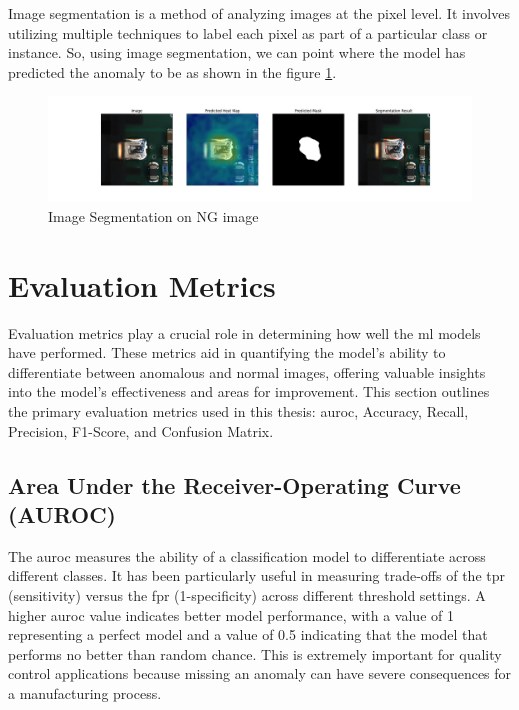 Image segmentation is a method of analyzing images at the pixel level. It involves utilizing multiple techniques to label each pixel as part of a particular class or instance\cite{IBM2024}. So, using image segmentation, we can point where the model has predicted the anomaly to be as shown in the figure \ref{fig:Image Segmentation on NG image}.

\begin{figure}[H]
    \centering
    \includegraphics[width=1\linewidth]{Images/anomalous_image_segmentation.jpg}
    \caption{Image Segmentation on NG image}
    \label{fig:Image Segmentation on NG image}
\end{figure}

\section{Evaluation Metrics}
\label{subsec:Evaluation Metrics}

Evaluation metrics play a crucial role in determining how well the \gls{ml} models have performed. These metrics aid in quantifying the model's ability to differentiate between anomalous and normal images, offering valuable insights into the model's effectiveness and areas for improvement. This section outlines the primary evaluation metrics used in this thesis: \gls{auroc}, Accuracy, Recall, Precision, F1-Score, and Confusion Matrix.

\subsection*{Area Under the Receiver-Operating Curve (AUROC)}
\label{subsec:AUROC}

The \gls{auroc} measures the ability of a classification model to differentiate across different classes. It has been particularly useful in measuring trade-offs of the \gls{tpr} (sensitivity) versus the \gls{fpr} (1-specificity) across different threshold settings. A higher \gls{auroc} value indicates better model performance, with a value of 1 representing a perfect model and a value of 0.5 indicating that the model that performs no better than random chance\cite{FAWCETT2006861}. This is extremely important for quality control applications because missing an anomaly can have severe consequences for a manufacturing process. %

